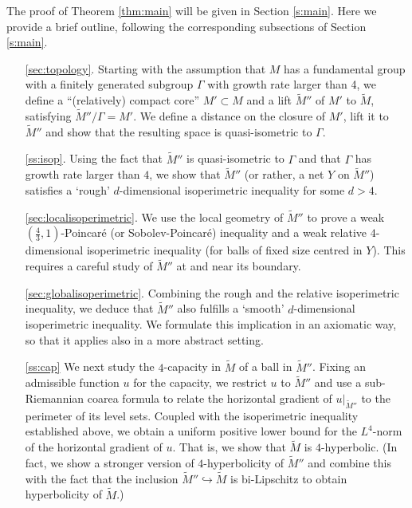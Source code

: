\documentclass[10pt,letterpaper]{amsart}
\theoremstyle{definition}
\numberwithin{thm}{subsection}
\numberwithin{equation}{section}
\begin{document}
The proof of Theorem \ref{thm:main} will be given in Section \ref{s:main}. Here we provide a brief outline, following the corresponding subsections of Section \ref{s:main}.
\begin{enumerate}
\item[\ref{sec:topology}.]\label{st:1} Starting with the assumption that $M$ has a fundamental group with a finitely generated subgroup $\Gamma$ with growth rate larger than 4, we define a ``(relatively) compact core'' $M'\subset M$ and a lift $\widetilde M''$ of $M'$ to $\widetilde M$, satisfying $\widetilde M''/\Gamma = M'$. We define a distance on the closure of ${M'}$, lift it to $\widetilde{M}''$ and show that the resulting space is quasi-isometric to $\Gamma$.
\item[\ref{ss:isop}.] Using the fact that $\widetilde{M}''$ is quasi-isometric to $\Gamma$ and that $\Gamma$ has growth rate larger than $4$, we show that $\widetilde{M}''$ (or rather, a net $Y$ on $\widetilde{M}''$) satisfies a `rough' $d$-dimensional isoperimetric inequality for some $d>4$.
\item[\ref{sec:localisoperimetric}.]\label{st:3} We use the local geometry of $\widetilde{M}''$ to prove a weak $(\frac{4}{3},1)$-Poincar\'{e} (or Sobolev-Poincar\'{e}) inequality and a weak relative $4$-dimensional isoperimetric inequality (for balls {of fixed size} centred in $Y$). This requires a careful study of $\widetilde{M}''$ at and near its boundary.
\item[\ref{sec:globalisoperimetric}.]\label{st:4} Combining the rough and the relative isoperimetric inequality, we deduce that $\widetilde{M}''$ also fulfills a `smooth' $d$-dimensional isoperimetric inequality. We formulate this implication in an axiomatic way, so that it applies also in a more abstract setting.
\item[\ref{ss:cap}] We next study the $4$-capacity in $\widetilde M$ of a ball in $\widetilde M''$. Fixing an admissible function $u$ for the capacity, we restrict $u$ to $\widetilde M''$ and use
 a sub-Riemannian coarea formula to relate the horizontal gradient of $u\vert_{\widetilde M''}$ to the perimeter of its level sets. Coupled with the isoperimetric inequality established above, we obtain a uniform positive lower bound for the $L^4$-norm of the horizontal gradient of $u$. That is, we show that $\widetilde M$ is $4$-hyperbolic. (In fact, we show a stronger version of $4$-hyperbolicity of $\widetilde M''$ and combine this with the fact that the inclusion $\widetilde M'' \hookrightarrow \widetilde M$ is bi-Lipschitz to obtain hyperbolicity of $\widetilde M$.)

\end{enumerate}
\end{document}

